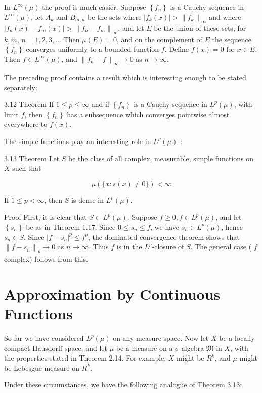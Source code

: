 \documentclass[10pt]{article}
\begin{document}
In $L^{\infty}(\mu)$ the proof is much easier. Suppose $\left\{f_{n}\right\}$ is a Cauchy sequence in $L^{\infty}(\mu)$, let $A_{k}$ and $B_{m, n}$ be the sets where $\left|f_{k}(x)\right|>\left\|f_{k}\right\|_{\infty}$ and where $\left|f_{n}(x)-f_{m}(x)\right|>\left\|f_{n}-f_{m}\right\|_{\infty}$, and let $E$ be the union of these sets, for $k, m$, $n=1,2,3, \ldots$ Then $\mu(E)=0$, and on the complement of $E$ the sequence $\left\{f_{n}\right\}$ converges uniformly to a bounded function $f$. Define $f(x)=0$ for $x \in E$. Then $f \in L^{\infty}(\mu)$, and $\left\|f_{n}-f\right\|_{\infty} \rightarrow 0$ as $n \rightarrow \infty$.

The preceding proof contains a result which is interesting enough to be stated separately:

3.12 Theorem If $1 \leq p \leq \infty$ and if $\left\{f_{n}\right\}$ is a Cauchy sequence in $L^{p}(\mu)$, with limit $f$, then $\left\{f_{n}\right\}$ has a subsequence which converges pointwise almost everywhere to $f(x)$.

The simple functions play an interesting role in $L^{p}(\mu)$ :

3.13 Theorem Let $S$ be the class of all complex, measurable, simple functions on $X$ such that

$$
\mu(\{x: s(x) \neq 0\})<\infty
$$

If $1 \leq p<\infty$, then $S$ is dense in $L^{p}(\mu)$.

Proof First, it is clear that $S \subset L^{p}(\mu)$. Suppose $f \geq 0, f \in L^{p}(\mu)$, and let $\left\{s_{n}\right\}$ be as in Theorem 1.17. Since $0 \leq s_{n} \leq f$, we have $s_{n} \in L^{p}(\mu)$, hence $s_{n} \in S$. Since $\left|f-s_{n}\right|^{p} \leq f^{p}$, the dominated convergence theorem shows that $\left\|f-s_{n}\right\|_{p} \rightarrow 0$ as $n \rightarrow \infty$. Thus $f$ is in the $L^{p}$-closure of $S$. The general case ( $f$ complex) follows from this.

\section{Approximation by Continuous Functions}
So far we have considered $L^{p}(\mu)$ on any measure space. Now let $X$ be a locally compact Hausdorff space, and let $\mu$ be a measure on a $\sigma$-algebra $\mathfrak{M}$ in $X$, with the properties stated in Theorem 2.14. For example, $X$ might be $R^{k}$, and $\mu$ might be Lebesgue measure on $R^{k}$.

Under these circumstances, we have the following analogue of Theorem 3.13:
\end{document}
